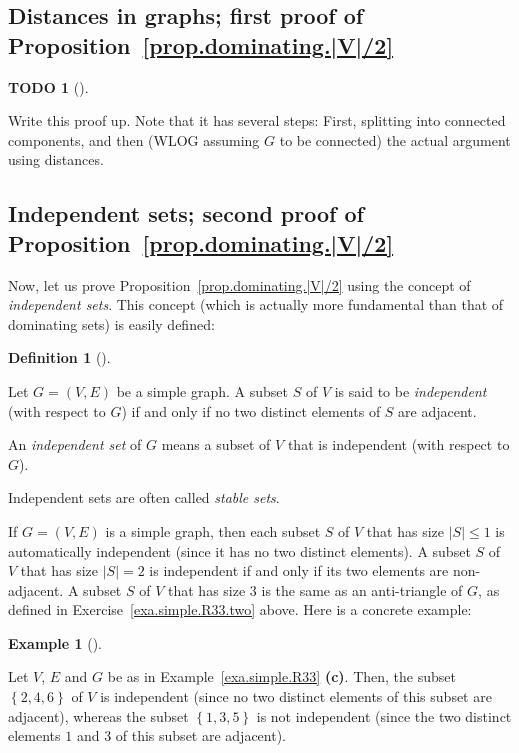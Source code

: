 \documentclass[numbers=enddot,12pt,final,onecolumn,notitlepage]{scrartcl}%
\theoremstyle{definition}
\newtheorem{defi}[theo]{Definition}
\newenvironment{definition}[1][]
{\begin{defi}[#1]\begin{leftbar}}
{\end{leftbar}\end{defi}}
\newtheorem{exam}[theo]{Example}
\newenvironment{example}[1][]
{\begin{exam}[#1]\begin{leftbar}}
{\end{leftbar}\end{exam}}
\newtheorem{quest}[theo]{TODO}
\newenvironment{todo}[1][]
{\begin{quest}[#1]\begin{leftbar}}
{\end{leftbar}\end{quest}}
\newcommand{\set}[1]{\left\{ #1 \right\}}
\newcommand{\abs}[1]{\left| #1 \right|}
\newcommand{\tup}[1]{\left( #1 \right)}
\begin{document}
\subsection{\label{subsect.dominating.part1} Distances in graphs;
first proof of Proposition~\ref{prop.dominating.|V|/2}}

\begin{todo}
 Write this proof up. Note that it has several steps: First,
 splitting into connected components, and then (WLOG assuming $G$
 to be connected) the actual argument using distances.
\end{todo}

\subsection{\label{subsect.dominating.part2} Independent sets;
second proof of Proposition~\ref{prop.dominating.|V|/2}}

Now, let us prove Proposition~\ref{prop.dominating.|V|/2} using the
concept of \textit{independent sets}. This concept (which is
actually more fundamental than that of dominating sets) is easily
defined:

\begin{definition} \label{def.dominating.indset}
Let $G = \tup{V, E}$ be a simple graph. A subset $S$ of $V$ is
said to be \textit{independent} (with respect to $G$) if and only
if no two distinct elements of $S$ are adjacent.

An \textit{independent set} of $G$ means a subset of $V$ that
is independent (with respect to $G$).
\end{definition}

Independent sets are often called \textit{stable sets}.

If $G = \tup{V, E}$ is a simple graph, then each subset $S$ of
$V$ that has size $\abs{S} \leq 1$ is automatically independent
(since it has no two distinct elements). A subset $S$ of $V$ that
has size $\abs{S} = 2$ is independent if and only if its two
elements are non-adjacent. A subset $S$ of $V$ that has size $3$
is the same as an anti-triangle of $G$, as defined in
Exercise~\ref{exa.simple.R33.two} above.
Here is a concrete example:

\begin{example}
Let $V$, $E$ and $G$ be as in Example~\ref{exa.simple.R33}
\textbf{(c)}. Then, the subset $\set{2, 4, 6}$ of $V$ is
independent (since no two distinct elements of this subset are
adjacent), whereas the subset $\set{1, 3, 5}$ is not
independent (since the two distinct elements $1$ and $3$ of
this subset are adjacent).
\end{example}
\end{document}
